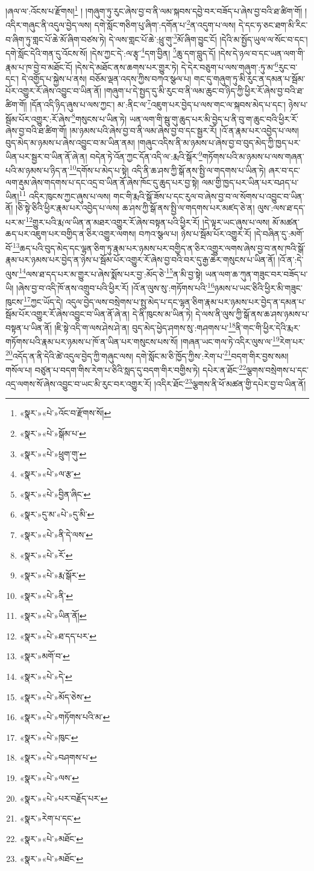 །ཞལ་ལ་:འོངས་པ་རྫོགས།\footnote{«སྣར་»«པེ་»འོང་བ་རྫོགས་སོ།} ། །གཞུག་ཏུ་རུང་ཞེས་བྱ་བ་ནི་ལམ་སྐབས་དབྱེ་བར་བཟོད་པ་ཞེས་བྱ་བའི་ཐ་ཚིག་གོ། །འདིར་གཞུང་ནི་འདུལ་བྱེད་ལས། དགེ་སློང་གཅིག་པུ་ཞིག་:དགོན་པ་\footnote{«སྣར་»«པེ་»སྒོམ་པ་}ན་འདུག་པ་ལས། དེ་དང་ཧ་ཅང་ཐག་མི་རིང་བ་ཞིག་ཏུ་གླང་པོ་ཆེ་མོ་ཞིག་བཙས་ཏེ། དེ་ལས་གླང་པོ་ཆེ་:ཕྲུ་གུ་\footnote{«སྣར་»«པེ་»ཕྲུག་གུ་}མོ་ཞིག་བྱུང་ངོ། །དེའི་མ་སྤྱོད་ཡུལ་ལ་སོང་བ་དང་། དགེ་སློང་དེའི་གན་དུ་འོངས་སོ། །དེས་ཀྱང་དེ་:ལ་རྩྭ་\footnote{«སྣར་»«པེ་»ལ་རྩ་}དག་བྱིན། \footnote{«སྣར་»«པེ་»བྱིན་ཞིང་}ཆུ་དག་བླུད་དོ། །དེས་དེ་ཉལ་བ་དང་ཡན་ལག་གི་རྣམ་པ་ཁ་བྱེ་བ་མཐོང་ངོ། །དེས་དེ་མཐོང་ནས་ཆགས་པར་གྱུར་ཏེ། དེ་དེར་བཅུག་པ་ལས་གཞུག་:ཏུ་མ་\footnote{«སྣར་»དུ་མ་«པེ་»དུ་མི་}རུང་བ་དང་། དེ་འགྱོད་པ་སྐྱེས་པ་ནས། བཅོམ་ལྡན་འདས་ཀྱིས་བཀའ་སྩལ་པ། གང་དུ་གཞུག་ཏུ་མི་རུང་ན་དམན་པ་སྦོམ་པོར་འགྱུར་རོ་ཞེས་འབྱུང་བ་ཡིན་ནོ། །གཞུག་པ་དེ་སྤྱད་དུ་མི་རུང་བ་ནི་ལམ་ཆུང་བ་ཉིད་ཀྱི་ཕྱིར་རོ་ཞེས་བྱ་བའི་ཐ་ཚིག་གོ། །དོན་འདི་ཉིད་ཞུས་པ་ལས་ཀྱང་། མ་:ནིང་ལ་\footnote{«སྣར་»«པེ་»ནི་དེ་ལས་}འཇུག་པར་བྱེད་པ་ལས་གང་ལ་སྐབས་མེད་པ་དང་། ཉེས་པ་སྦོམ་པོར་འགྱུར་:རོ་ཞེས་\footnote{«སྣར་»«པེ་»རོ་}གསུངས་པ་ཡིན་ཏེ། ཡན་ལག་གི་སྦུ་གུ་ཆུད་པར་མི་བྱེད་པ་ནི་བུ་ག་ཆུང་བའི་ཕྱིར་རོ་ཞེས་བྱ་བའི་ཐ་ཚིག་གོ། །མ་ཉམས་པའི་ཞེས་བྱ་བ་ནི་ལམ་ཞེས་བྱ་བ་དང་སྦྱར་རོ། །འོ་ན་རྣམ་པར་འབྱེད་པ་ལས། བུད་མེད་མ་ཉམས་པ་ཞེས་འབྱུང་བ་མ་ཡིན་ནམ། །གཞུང་འདིས་ནི་མ་ཉམས་པ་ཞེས་བྱ་བ་བུད་མེད་ཀྱི་ཁྱད་པར་ཡིན་པར་སྦྱར་བ་ཡིན་ནོ་ཞེ་ན། བདེན་ཏེ་འོན་ཀྱང་དོན་འདི་ལ་:རྨའི་སྒོར་\footnote{«སྣར་»«པེ་»རྨ་སྒོར་}གཏོགས་པའི་མ་ཉམས་པ་ལས་གཞན་པའི་མ་ཉམས་པ་ཉིད་ན་\footnote{«སྣར་»«པེ་»ནི་}དགོས་པ་མེད་པ་སྟེ། འདི་ནི་ཆ་ཤས་ཀྱི་སྒོ་ནས་སྤྱི་ལ་གདགས་པ་ཡིན་ཏེ། ཞར་བ་དང་ལག་རྡུམ་ཞེས་གདགས་པ་དང་འདྲ་བ་ཡིན་ནོ་ཞེས་ཁོང་དུ་ཆུད་པར་བྱ་སྟེ། ལམ་གྱི་ཁྱད་པར་ཡིན་པར་བཤད་པ་ཡིན།\footnote{«སྣར་»«པེ་»ཡིན་ནོ།} འདིར་ཁུངས་ཀྱང་ཞུས་པ་ལས། གང་གི་རྨའི་སྒོ་ཟོས་པ་དང་རུལ་བ་ཞེས་བྱ་བ་ལ་སོགས་པ་འབྱུང་བ་ཡིན་ནོ། །ཅི་སྟེ་ཅིའི་ཕྱིར་རྣམ་པར་འབྱེད་པ་ལས། ཆ་ཤས་ཀྱི་སྒོ་ནས་སྤྱི་ལ་གདགས་པར་མཛད་ཅེ་ན། ལུས་:ལས་ཐ་དད་པར་མ་\footnote{«སྣར་»«པེ་»ཐ་དད་པར་}གྱུར་པའི་རྨ་ལ་ཡིན་ན་མཐར་འགྱུར་རོ་ཞེས་བསྟན་པའི་ཕྱིར་རོ། །དེ་ལྟར་ཡང་ཞུས་པ་ལས། མོ་མཚན་ཆད་པར་འཇུག་པར་བགྱིད་ན་ཅིར་འགྱུར་ལགས། བཀའ་སྩལ་པ། ཉེས་པ་སྦོམ་པོར་འགྱུར་རོ། །དེ་བཞིན་དུ་:མགོ་བོ་\footnote{«སྣར་»མགོ་བ་}ཆད་པའི་བུད་མེད་དང་ལྷན་ཅིག་ཏུ་རྣམ་པར་ཉམས་པར་བགྱིད་ན་ཅིར་འགྱུར་ལགས་ཞེས་བྱ་བ་ནས་ཁའི་སྒོ་རྣམ་པར་ཉམས་པར་བྱེད་ན་ཉེས་པ་སྦོམ་པོར་འགྱུར་རོ་ཞེས་བྱ་བའི་བར་དུ་རྒྱ་ཆེར་གསུངས་པ་ཡིན་ནོ། །འོ་ན་:དེ་ལུས་\footnote{«སྣར་»«པེ་»དེ་}ལས་ཐ་དད་པར་མ་གྱུར་པ་ཞེས་སྨོས་པར་བྱ་:མོད་ཅེ་\footnote{«སྣར་»«པེ་»མོད་ཅེས་}ན་མི་བྱ་སྟེ། ཡན་ལག་ཆ་ཀུན་གཟུང་བར་བཟོད་པ་ཡི། །ཞེས་བྱ་བ་འདི་ཁོ་ནས་འགྲུབ་པའི་ཕྱིར་རོ། །འོ་ན་ལུས་སུ་:གཏོགས་པའི་\footnote{«སྣར་»«པེ་»གཏོགས་པའི་མ་}ཉམས་པ་ཡང་ཅིའི་ཕྱིར་མི་གཟུང་ཁུངས་\footnote{«སྣར་»«པེ་»ཁུང་}ཀྱང་ཡོད་དེ། འདུལ་བྱེད་ལས་བསྲེགས་པ་སྤུ་མེད་པ་དང་ལྷན་ཅིག་རྣམ་པར་ཉམས་པར་བྱེད་ན་དམན་པ་སྦོམ་པོར་འགྱུར་རོ་ཞེས་འབྱུང་བ་ཡིན་ནོ་ཞེ་ན། དེ་ནི་ཁུངས་མ་ཡིན་ཏེ། དེ་ལས་ནི་ལུས་ཀྱི་སྒོ་ནས་ཆ་ཤས་ཉམས་པ་བསྟན་པ་ཡིན་ནོ། །ཇི་སྟེ་འདི་ག་ལས་ཤེས་ཤེ་ན། བུད་མེད་ཕྱེད་ཤགས་སུ་:གཤགས་པ་\footnote{«སྣར་»«པེ་»བཤགས་པ་}ནི་གང་གི་ཕྱིར་དེའི་རྨར་གཏོགས་པའི་རྣམ་པར་ཉམས་པ་ཁོ་ན་ཡིན་པར་གསུངས་པས་སོ། །གཞན་ཡང་གལ་ཏེ་འདིར་ལུས་ལ་\footnote{«སྣར་»«པེ་»ལས་}རེག་པར་\footnote{«སྣར་»«པེ་»པར་བརྗོད་པར་}འདོད་ན་ནི་དེའི་ཚེ་འདུལ་བྱེད་ཀྱི་གཞུང་ལས། དགེ་སློང་མ་ཅི་ཁྱོད་ཀྱིས་:རེག་པ་\footnote{«སྣར་»རེག་པ་དང་}བདག་གིར་བྱས་སམ། གསོལ་པ། བཙུན་པ་བདག་གིས་རེག་པ་ཅིའི་སླད་དུ་བདག་གིར་བགྱིས་ཏེ། དཔེར་ན་ཐོང་\footnote{«སྣར་»«པེ་»མཐོང་}ལྕགས་བསྲེགས་པ་དང་འདྲ་ལགས་སོ་ཞེས་འབྱུང་བ་ཡང་མི་རུང་བར་འགྱུར་རོ། །འདིར་ཐོང་\footnote{«སྣར་»«པེ་»མཐོང་}ལྕགས་ནི་ཕོ་མཚན་གྱི་དཔེར་བྱ་བ་ཡིན་ནོ། 